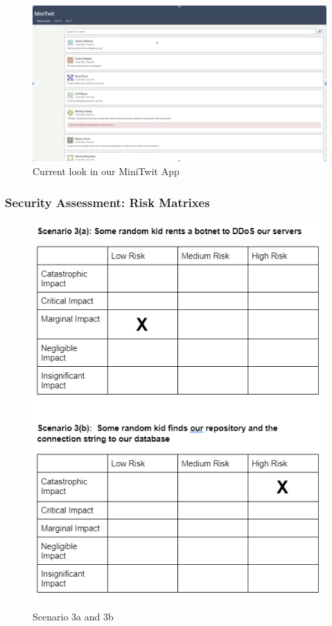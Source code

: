 \documentclass{article}
\begin{document}
\begin{figure}[h!]
    \centering
    \includegraphics[scale=0.5]{images/minitwit.png}
    \caption{ Current look in our MiniTwit App }
\end{figure}

\newpage
\subsubsection{Security Assessment: Risk Matrixes}
\begin{figure}[h!]
    \centering
    \includegraphics[scale=0.5]{images/risk_1.PNG}
    \caption{ Scenario 3a and 3b }
\end{figure}
\end{document}
